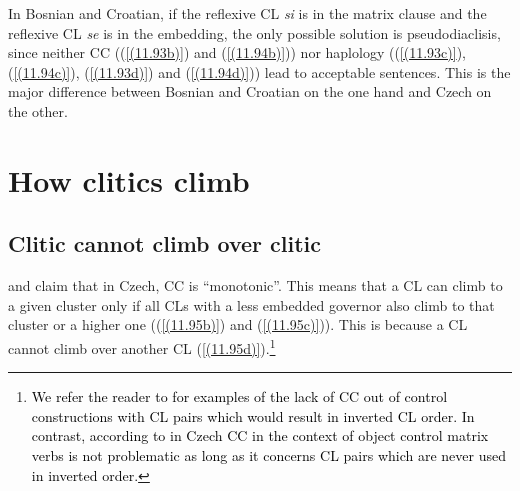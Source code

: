 \noindent In Bosnian and Croatian, if the reflexive CL \textit{si} is in the matrix clause and the reflexive CL \textit{se} is in the embedding, the only possible solution is pseudodiaclisis, since neither CC ((\ref{(11.93b)}) and (\ref{(11.94b)})) nor haplology ((\ref{(11.93c)}), (\ref{(11.94c)}), (\ref{(11.93d)}) and (\ref{(11.94d)})) lead to acceptable sentences. This is the major difference between Bosnian and Croatian on the one hand and Czech on the other.

\section{How clitics climb}
\label{How clitics climb}
\subsection{Clitic cannot climb over clitic}
\label{Clitic cannot climb over clitic}

\citet[127]{Hana07} and \citet[102]{Rosen14} claim that in Czech, CC is “monotonic”. This means that a CL can climb to a given cluster only if all CLs with a less embedded governor also climb to that cluster or a higher one ((\ref{(11.95b)}) and (\ref{(11.95c)})). This is because a CL cannot climb over another CL (\ref{(11.95d)}).\footnote{\textcolor{black}{We refer the reader to \citet[153]{Lenertova04} for examples of the lack of CC out of control constructions with CL pairs which would result in inverted CL order. In contrast, according to \citet[153]{Lenertova04} in Czech CC in the context of object control matrix verbs is not problematic as long as it concerns CL pairs which are never used in inverted order.}} 

